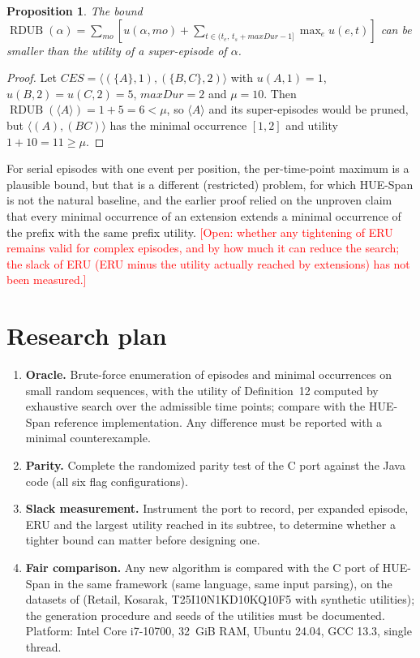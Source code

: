 \documentclass[11pt]{article}
\newtheorem{proposition}{Proposition}
\newcommand{\RDUB}{\operatorname{RDUB}}
\newcommand{\HUESpan}{\textsf{HUE-Span}}
\newcommand{\open}[1]{\textcolor{red}{[Open: #1]}}
\begin{document}
\begin{proposition}
The bound $\RDUB(\alpha) = \sum_{mo} [u(\alpha, mo) + \sum_{t \in (t_e,\, t_s + \mathit{maxDur} - 1]} \max_e u(e,t)]$ can be smaller than the utility of a super-episode of $\alpha$.
\end{proposition}
\begin{proof}
Let $\mathit{CES} = \langle (\{A\}, 1), (\{B, C\}, 2)\rangle$ with $u(A,1) = 1$, $u(B,2) = u(C,2) = 5$, $\mathit{maxDur} = 2$ and $\mu = 10$. Then $\RDUB(\langle A\rangle) = 1 + 5 = 6 < \mu$, so $\langle A\rangle$ and its super-episodes would be pruned, but $\langle (A), (B C)\rangle$ has the minimal occurrence $[1,2]$ and utility $1 + 10 = 11 \ge \mu$.
\end{proof}

\noindent For serial episodes with one event per position, the per-time-point maximum is a plausible bound, but that is a different (restricted) problem, for which \HUESpan{} is not the natural baseline, and the earlier proof relied on the unproven claim that every minimal occurrence of an extension extends a minimal occurrence of the prefix with the same prefix utility. \open{whether any tightening of ERU remains valid for complex episodes, and by how much it can reduce the search; the slack of ERU (ERU minus the utility actually reached by extensions) has not been measured.}

\section{Research plan}\label{sec:plan}

\begin{enumerate}
\item \textbf{Oracle.} Brute-force enumeration of episodes and minimal occurrences on small random sequences, with the utility of Definition~12 computed by exhaustive search over the admissible time points; compare with the \HUESpan{} reference implementation. Any difference must be reported with a minimal counterexample.
\item \textbf{Parity.} Complete the randomized parity test of the C port against the Java code (all six flag configurations).
\item \textbf{Slack measurement.} Instrument the port to record, per expanded episode, ERU and the largest utility reached in its subtree, to determine whether a tighter bound can matter before designing one.
\item \textbf{Fair comparison.} Any new algorithm is compared with the C port of \HUESpan{} in the same framework (same language, same input parsing), on the datasets of \cite{fournier2019huespan} (Retail, Kosarak, T25I10N1KD10KQ10F5 with synthetic utilities); the generation procedure and seeds of the utilities must be documented. Platform: Intel Core i7-10700, 32~GiB RAM, Ubuntu 24.04, GCC 13.3, single thread.
\end{enumerate}
\end{document}
